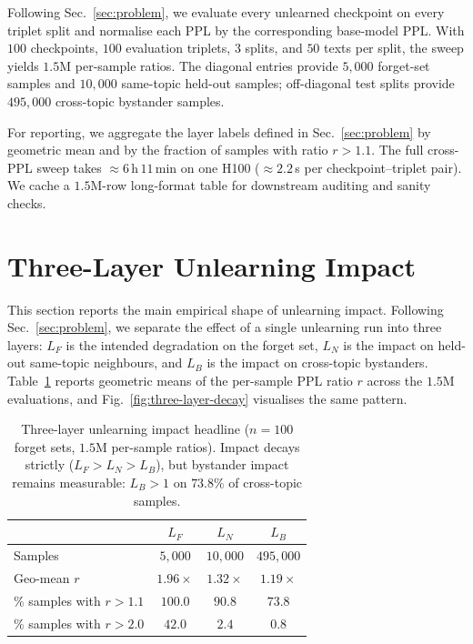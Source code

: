 \documentclass[11pt,a4paper]{article}
\newcommand{\Lforget}{L_F}
\newcommand{\Lneigh}{L_N}
\newcommand{\Lbyst}{L_B}
\begin{document}
Following Sec.~\ref{sec:problem}, we evaluate every unlearned checkpoint on
every triplet split and normalise each PPL by the corresponding base-model
PPL. With $100$ checkpoints, $100$ evaluation triplets, $3$ splits, and $50$
texts per split, the sweep yields $1.5$M per-sample ratios. The diagonal
entries provide $5{,}000$ forget-set samples and $10{,}000$ same-topic held-out
samples; off-diagonal test splits provide $495{,}000$ cross-topic bystander
samples.

For reporting, we aggregate the layer labels defined in Sec.~\ref{sec:problem}
by geometric mean and by the fraction of samples with ratio $r{>}1.1$. The
full cross-PPL sweep takes $\approx 6$\,h\,$11$\,min on one H100
($\approx 2.2$\,s per checkpoint--triplet pair). We cache a $1.5$M-row
long-format table for downstream auditing and sanity checks.

\section{Three-Layer Unlearning Impact}
\label{sec:three-layer}

This section reports the main empirical shape of unlearning impact. Following
Sec.~\ref{sec:problem}, we separate the effect of a single unlearning run into
three layers: $\Lforget$ is the intended degradation on the forget set,
$\Lneigh$ is the impact on held-out same-topic neighbours, and $\Lbyst$ is the
impact on cross-topic bystanders. Table~\ref{tab:headline} reports geometric
means of the per-sample PPL ratio $r$ across the $1.5$M evaluations, and
Fig.~\ref{fig:three-layer-decay} visualises the same pattern.

\begin{table}[t]
\centering
\small
\setlength{\tabcolsep}{4pt}
\begin{tabular}{@{}lccc@{}}
    \toprule
                                                   & $\Lforget$ & $\Lneigh$ & $\Lbyst$ \\
    \midrule
    Samples                                        & $5{,}000$ & $10{,}000$ & $495{,}000$ \\
    Geo-mean $r$                                   & \textbf{$1.96\times$} & \textbf{$1.32\times$} & \textbf{$1.19\times$} \\
    \% samples with $r{>}1.1$                      & $100.0$ & $90.8$ & $73.8$ \\
    \% samples with $r{>}2.0$                      & $42.0$  & $2.4$  & $0.8$ \\
    \bottomrule
\end{tabular}
\caption{Three-layer unlearning impact headline ($n{=}100$ forget sets, $1.5$M per-sample ratios). Impact decays strictly ($\Lforget{>}\Lneigh{>}\Lbyst$), but bystander impact remains measurable: $\Lbyst{>}1$ on $73.8\%$ of cross-topic samples.}
\label{tab:headline}
\end{table}
\end{document}
